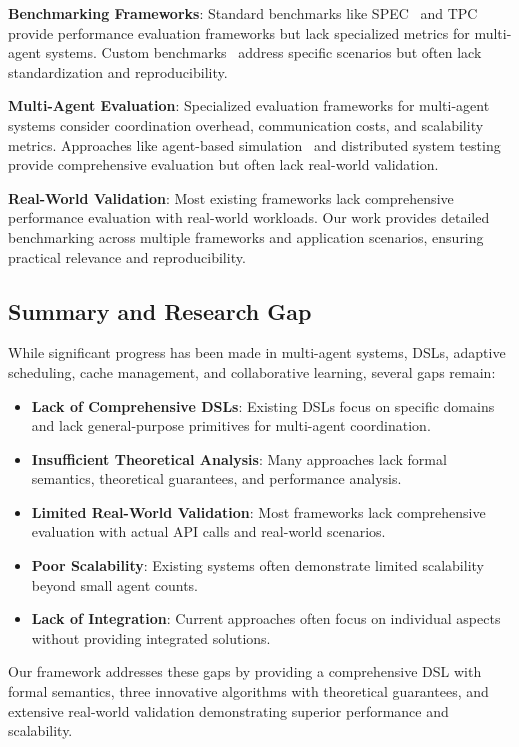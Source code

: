 \documentclass[conference]{IEEEtran}
\begin{document}
\textbf{Benchmarking Frameworks}: Standard benchmarks like SPEC~\cite{spec2019} and TPC~\cite{tpc2020} provide performance evaluation frameworks but lack specialized metrics for multi-agent systems. Custom benchmarks~\cite{custom_benchmark2021} address specific scenarios but often lack standardization and reproducibility.

\textbf{Multi-Agent Evaluation}: Specialized evaluation frameworks for multi-agent systems consider coordination overhead, communication costs, and scalability metrics. Approaches like agent-based simulation~\cite{agent_sim2022} and distributed system testing~\cite{dist_test2023} provide comprehensive evaluation but often lack real-world validation.

\textbf{Real-World Validation}: Most existing frameworks lack comprehensive performance evaluation with real-world workloads. Our work provides detailed benchmarking across multiple frameworks and application scenarios, ensuring practical relevance and reproducibility.

\subsection{Summary and Research Gap}

While significant progress has been made in multi-agent systems, DSLs, adaptive scheduling, cache management, and collaborative learning, several gaps remain:

\begin{itemize}
\item \textbf{Lack of Comprehensive DSLs}: Existing DSLs focus on specific domains and lack general-purpose primitives for multi-agent coordination.
\item \textbf{Insufficient Theoretical Analysis}: Many approaches lack formal semantics, theoretical guarantees, and performance analysis.
\item \textbf{Limited Real-World Validation}: Most frameworks lack comprehensive evaluation with actual API calls and real-world scenarios.
\item \textbf{Poor Scalability}: Existing systems often demonstrate limited scalability beyond small agent counts.
\item \textbf{Lack of Integration}: Current approaches often focus on individual aspects without providing integrated solutions.
\end{itemize}

Our framework addresses these gaps by providing a comprehensive DSL with formal semantics, three innovative algorithms with theoretical guarantees, and extensive real-world validation demonstrating superior performance and scalability.
\end{document}
